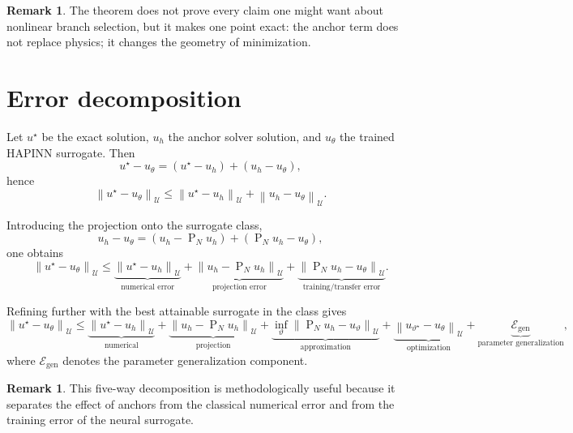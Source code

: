 \documentclass[preprint,12pt]{elsarticle}
\theoremstyle{definition}
\newtheorem{remark}[theorem]{Remark}
\numberwithin{equation}{section}
\newcommand{\cU}{\mathcal{U}}
\newcommand{\norm}[1]{\left\lVert #1 \right\rVert}
\newcommand{\Proj}{\operatorname{P}}
\begin{document}
\begin{remark}
The theorem does not prove every claim one might want about nonlinear branch selection, but it makes one point exact: the anchor term does not replace physics; it changes the geometry of minimization.
\end{remark}

\section{Error decomposition}
\label{sec:error}

Let $u^\star$ be the exact solution, $u_h$ the anchor solver solution, and $u_\theta$ the trained HAPINN surrogate. Then
\begin{equation}
u^\star-u_\theta=(u^\star-u_h)+(u_h-u_\theta),
\label{eq:basicid}
\end{equation}
hence
\begin{equation}
\norm{u^\star-u_\theta}_{\cU}
\le
\norm{u^\star-u_h}_{\cU}
+
\norm{u_h-u_\theta}_{\cU}.
\label{eq:trianglemain}
\end{equation}

Introducing the projection onto the surrogate class,
\[
u_h-u_\theta=(u_h-\Proj_Nu_h)+(\Proj_Nu_h-u_\theta),
\]
one obtains
\begin{equation}
\norm{u^\star-u_\theta}_{\cU}
\le
\underbrace{\norm{u^\star-u_h}_{\cU}}_{\text{numerical error}}
+
\underbrace{\norm{u_h-\Proj_Nu_h}_{\cU}}_{\text{projection error}}
+
\underbrace{\norm{\Proj_Nu_h-u_\theta}_{\cU}}_{\text{training/transfer error}}.
\label{eq:decomp1}
\end{equation}

Refining further with the best attainable surrogate in the class gives
\begin{equation}
\norm{u^\star-u_\theta}_{\cU}
\le
\underbrace{\norm{u^\star-u_h}_{\cU}}_{\text{numerical}}
+
\underbrace{\norm{u_h-\Proj_Nu_h}_{\cU}}_{\text{projection}}
+
\underbrace{\inf_\vartheta \norm{\Proj_Nu_h-u_\vartheta}_{\cU}}_{\text{approximation}}
+
\underbrace{\norm{u_{\vartheta^\star}-u_\theta}_{\cU}}_{\text{optimization}}
+
\underbrace{\mathcal{E}_{\mathrm{gen}}}_{\text{parameter generalization}},
\label{eq:extendeddecomp}
\end{equation}
where $\mathcal{E}_{\mathrm{gen}}$ denotes the parameter generalization component.

\begin{remark}
This five-way decomposition is methodologically useful because it separates the effect of anchors from the classical numerical error and from the training error of the neural surrogate.
\end{remark}
\end{document}
